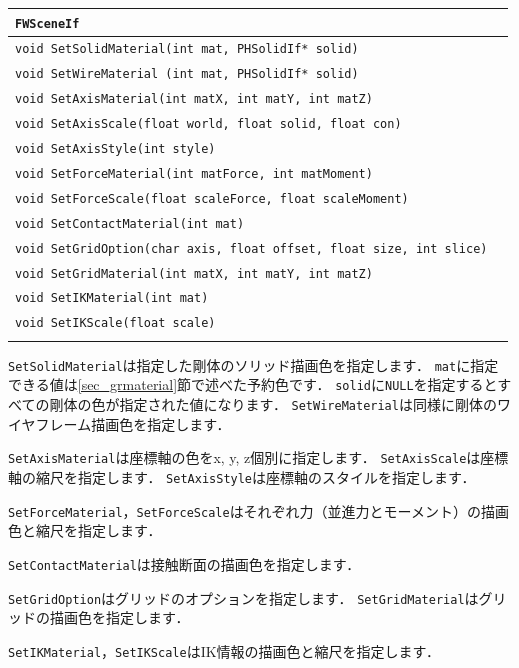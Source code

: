 \noindent
\begin{tabular}{p{.8\hsize}p{.1\hsize}}
\\
\texttt{FWSceneIf}																\\ \midrule
\texttt{void SetSolidMaterial(int mat, PHSolidIf* solid)}						&	\\
\texttt{void SetWireMaterial (int mat, PHSolidIf* solid)}						&	\\
\texttt{void SetAxisMaterial(int matX, int matY, int matZ)}						&	\\
\texttt{void SetAxisScale(float world, float solid, float con)}					&	\\
\texttt{void SetAxisStyle(int style)}											&	\\
\texttt{void SetForceMaterial(int matForce, int matMoment)}						&	\\
\texttt{void SetForceScale(float scaleForce, float scaleMoment)}				&	\\
\texttt{void SetContactMaterial(int mat)}										&	\\
\texttt{void SetGridOption(char axis, float offset, float size, int slice)}		&	\\
\texttt{void SetGridMaterial(int matX, int matY, int matZ)}						&	\\
\texttt{void SetIKMaterial(int mat)}											&	\\
\texttt{void SetIKScale(float scale)}											&	\\
\\
\end{tabular}

\texttt{SetSolidMaterial}は指定した剛体のソリッド描画色を指定します．
\texttt{mat}に指定できる値は\ref{sec_grmaterial}節で述べた予約色です．
\texttt{solid}に\texttt{NULL}を指定するとすべての剛体の色が指定された値になります．
\texttt{SetWireMaterial}は同様に剛体のワイヤフレーム描画色を指定します．

\texttt{SetAxisMaterial}は座標軸の色をx, y, z個別に指定します．
\texttt{SetAxisScale}は座標軸の縮尺を指定します．
\texttt{SetAxisStyle}は座標軸のスタイルを指定します．

\texttt{SetForceMaterial}，\texttt{SetForceScale}はそれぞれ力（並進力とモーメント）の描画色と縮尺を指定します．

\texttt{SetContactMaterial}は接触断面の描画色を指定します．

\texttt{SetGridOption}はグリッドのオプションを指定します．
\texttt{SetGridMaterial}はグリッドの描画色を指定します．

\texttt{SetIKMaterial}，\texttt{SetIKScale}はIK情報の描画色と縮尺を指定します．


